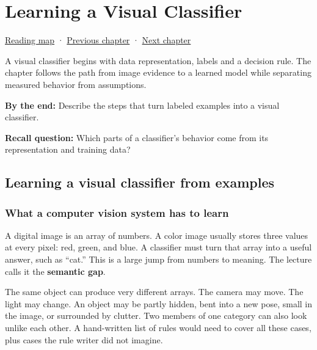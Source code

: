 \chapter{Learning a Visual Classifier}\label{04-visual-computing-ii-ch031-learning-a-visual-classifier}\hypertarget{04-visual-computing-ii-ch031}{}\label{stagechapter:04-visual-computing-ii-ch031}

\hypertarget{04-visual-computing-ii-ch031-learning-a-visual-classifier}{}

\hyperref[volume-reading-map]{Reading map} · \hyperref[02-foundations-ii-ch039]{Previous chapter} · \hyperref[04-visual-computing-ii-ch032-pose-estimation-and-robust-fitting]{Next chapter}

A visual classifier begins with data representation, labels and a decision rule. The chapter follows the path from image evidence to a learned model while separating measured behavior from assumptions.

\textbf{By the end:} Describe the steps that turn labeled examples into a visual classifier.

\textbf{Recall question:} Which parts of a classifier's behavior come from its representation and training data?

\section{Learning a visual classifier from examples}\label{04-visual-computing-ii-ch031-learning-a-visual-classifier-from-examples}

\hypertarget{04-visual-computing-ii-ch031-learning-a-visual-classifier-from-examples}{}

\subsection{What a computer vision system has to learn}\label{04-visual-computing-ii-ch031-what-a-computer-vision-system-has-to-learn}

\hypertarget{04-visual-computing-ii-ch031-what-a-computer-vision-system-has-to-learn}{}

A digital image is an array of numbers. A color image usually stores three values at every pixel: red, green, and blue. A classifier must turn that array into a useful answer, such as ``cat.'' This is a large jump from numbers to meaning. The lecture calls it the \textbf{semantic gap}.

The same object can produce very different arrays. The camera may move. The light may change. An object may be partly hidden, bent into a new pose, small in the image, or surrounded by clutter. Two members of one category can also look unlike each other. A hand-written list of rules would need to cover all these cases, plus cases the rule writer did not imagine.

